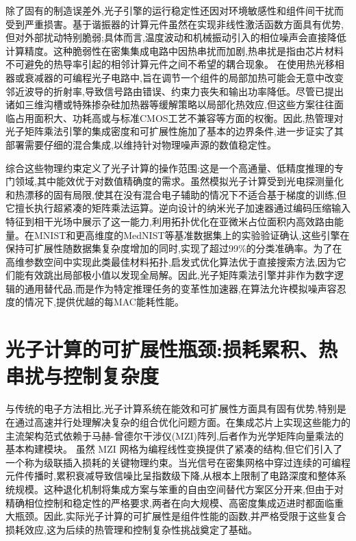 除了固有的制造误差外,光子引擎的运行稳定性还因对环境敏感性和组件间干扰而受到严重损害。基于谐振器的计算元件虽然在实现非线性激活函数方面具有优势,但对外部扰动特别脆弱;具体而言,温度波动和机械振动引入的相位噪声会直接降低计算精度。这种脆弱性在密集集成电路中因热串扰而加剧,热串扰是指由芯片材料不可避免的热导率引起的相邻计算元件之间不希望的耦合现象。\citep{doi_10_1109_access_2020_3013116_8fec1fb2} 在使用热光移相器或衰减器的可编程光子电路中,旨在调节一个组件的局部加热可能会无意中改变邻近波导的折射率,导致信号路由错误、约束力丧失和输出功率降低。尽管已提出诸如三维沟槽或特殊掺杂硅加热器等缓解策略以局部化热效应,但这些方案往往面临占用面积大、功耗高或与标准CMOS工艺不兼容等方面的权衡。因此,热管理对光子矩阵乘法引擎的集成密度和可扩展性施加了基本的边界条件,进一步证实了其部署需要仔细的混合集成,以维持针对物理噪声源的数值稳定性。\citep{doi_10_3390_nano14080697_c372a140} \citep{doi_10_1109_access_2020_3013116_8fec1fb2}

综合这些物理约束定义了光子计算的操作范围:这是一个高通量、低精度推理的专门领域,其中能效优于对数值精确度的需求。虽然模拟光子计算受到光电探测量化和热漂移的固有局限,使其在没有混合电子辅助的情况下不适合基于梯度的训练,但它擅长执行超紧凑的矩阵乘法运算。逆向设计的纳米光子加速器通过编码压缩输入特征到相干光场中展示了这一能力,利用拓扑优化在亚微米占位面积内高效路由能量。在MNIST和更高维度的MedNIST等基准数据集上的实验验证确认,这些引擎在保持可扩展性随数据集复杂度增加的同时,实现了超过99\%的分类准确率。为了在高维参数空间中实现此类最佳材料拓扑,启发式优化算法优于直接搜索方法,因为它们能有效跳出局部极小值以发现全局解。因此,光子矩阵乘法引擎并非作为数字逻辑的通用替代品,而是作为特定推理任务的变革性加速器,在算法允许模拟噪声容忍度的情况下,提供优越的每MAC能耗性能。\citep{doi_10_1038_s41467_026_68648_1_26658a9c} \citep{s2_cea9e6112f363e19aa754d2681622ab07650c71c_7db5c737} \citep{doi_10_3390_nano14080697_c372a140} \citep{doi_10_1515_nanoph_2022_0423_38a2c3ec}

\section{光子计算的可扩展性瓶颈:损耗累积、热串扰与控制复杂度}\label{ux5149ux5b50ux8ba1ux7b97ux7684ux53efux6269ux5c55ux6027ux74f6ux9888ux635fux8017ux7d2fux79efux70edux4e32ux6270ux4e0eux63a7ux5236ux590dux6742ux5ea6}

与传统的电子方法相比,光子计算系统在能效和可扩展性方面具有固有优势,特别是在通过高速并行处理解决复杂的组合优化问题方面。在集成芯片上实现这些能力的主流架构范式依赖于马赫-曾德尔干涉仪(MZI)阵列,后者作为光学矩阵向量乘法的基本构建模块。\citep{doi_10_1088_1402_4896_ae8345_3b948559} 虽然 MZI 网格为编程线性变换提供了紧凑的结构,但它们引入了一个称为级联插入损耗的关键物理约束。当光信号在密集网格中穿过连续的可编程元件传播时,累积衰减导致信噪比呈指数级下降,从根本上限制了电路深度和整体系统规模。这种退化机制将集成方案与笨重的自由空间替代方案区分开来,但由于对精确相位控制和稳定性的严格要求,两者在向大规模、高密度集成迈进时都面临重大瓶颈。因此,实际光子计算的可扩展性是组件性能的函数,并严格受限于这些复合损耗效应,这为后续的热管理和控制复杂性挑战奠定了基础。\citep{doi_10_1088_1402_4896_ae8345_3b948559} \citep{doi_10_3390_nano14080697_c372a140}

